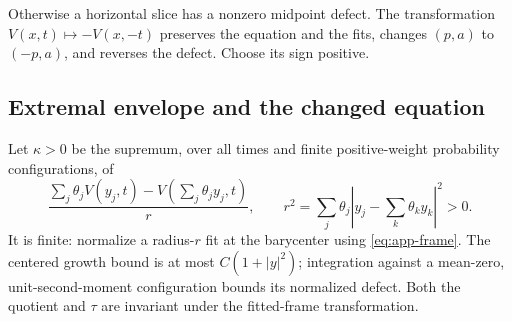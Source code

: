 Otherwise a horizontal slice has a nonzero midpoint defect. The
transformation $V(x,t)\mapsto-V(x,-t)$ preserves the equation and
the fits, changes $(p,a)$ to $(-p,a)$, and reverses the defect. Choose
its sign positive.

\subsection{Extremal envelope and the changed equation}

Let $\kappa>0$ be the supremum, over all times and finite
positive-weight probability configurations, of
\[
 \frac{\sum_j\theta_jV(y_j,t)-V(\sum_j\theta_jy_j,t)}r,
 \qquad
 r^2=\sum_j\theta_j\left|y_j-\sum_k\theta_ky_k\right|^2>0.
\]
It is finite: normalize a radius-$r$ fit at the barycenter using
\eqref{eq:app-frame}. The centered growth bound is at most
$C(1+|y|^2)$; integration against a mean-zero, unit-second-moment
configuration bounds its normalized defect. Both the quotient and
$\tau$ are invariant under the fitted-frame transformation.

